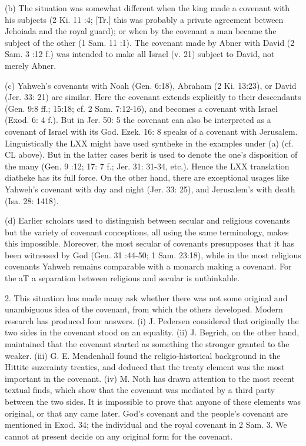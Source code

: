 				(b) The situation was somewhat different when the king made a covenant with his subjects (2 Ki. 11 :4; [Tr.] this was probably a private agreement between Jehoiada and the royal guard); or when by the covenant a man became the subject of the other (1 Sam. 11 :1). The covenant made by Abner with David (2 Sam. 3 :12 f.) was intended to make all Israel (v. 21) subject to David, not merely Abner. 

				(c) Yahweh's covenants with Noah (Gen. 6:18), Abraham (2 Ki. 13:23), or David (Jer. 33: 21) are similar. Here the covenant extends explicitly to their descendants (Gen. 9:8 ff.; 15:18; cf. 2 Sam. 7:12-16), and becomes a covenant with Israel (Exod. 6: 4 f.). But in Jer. 50: 5 the covenant can also be interpreted as a covenant of Israel with its God. Ezek. 16: 8 speaks of a covenant with Jerusalem. Linguistically the LXX might have used syntheke in the examples under (a) (cf. CL above). But in the latter cases berit is used to denote the one's disposition of the many (Gen. 9 :12; 17: 7 f.; Jer. 31: 31-34, etc.). Hence the LXX translation diatheke has its full force. On the other hand, there are exceptional usages like Yahweh's covenant with day and night (Jer. 33: 25), and Jerusalem's with death (Isa. 28: 1418). 

				(d) Earlier scholars used to distinguish between secular and religious covenants but the variety of covenant conceptions, all using the same terminology, makes this impossible. Moreover, the most secular of covenants presupposes that it has been witnessed by God (Gen. 31 :44-50; 1 Sam. 23:18), while in the most religious covenants Yahweh remains comparable with a monarch making a covenant. For the aT a separation between religious and secular is unthinkable. 

				2. This situation has made many ask whether there was not some original and unambiguous idea of the covenant, from which the others developed. Modern research has produced four answers. (i) J. Pedersen considered that originally the two sides in the covenant stood on an equality. (ii) J. Begrich, on the other hand, maintained that the covenant started as something the stronger granted to the weaker. (iii) G. E. Mendenhall found the religio-historical background in the Hittite suzerainty treaties, and deduced that the treaty element was the most important in the covenant. (iv) M. Noth has drawn attention to the most recent textual finds, which show that the covenant was mediated by a third party between the two sides. It is impossible to prove that anyone of these elements was original, or that any came later. God's covenant and the people's covenant are mentioned in Exod. 34; the individual and the royal covenant in 2 Sam. 3. We cannot at present decide on any original form for the covenant. 

